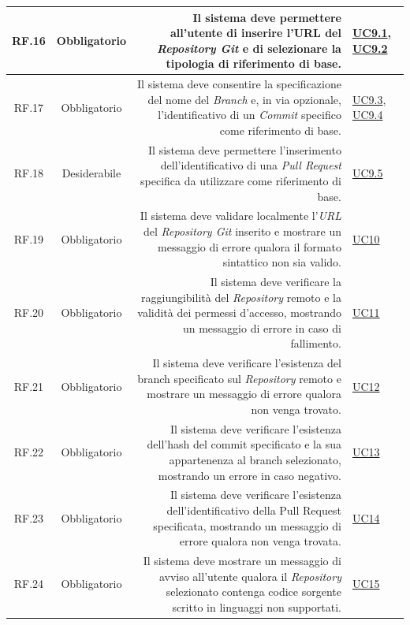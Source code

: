\documentclass[12pt, a4paper]{article}
\begin{document}
\begin{xltabular}{\textwidth}{|c|c|D|F|}
    RF.16 & Obbligatorio & Il sistema deve permettere all'utente di inserire l'URL del \textit{Repository Git} e di selezionare la tipologia di riferimento di base. & \hyperref[uc:9.1]{UC9.1}, \hyperref[uc:9.2]{UC9.2} \\ \hline
    
    RF.17 & Obbligatorio & Il sistema deve consentire la specificazione del nome del \textit{Branch} e, in via opzionale, l'identificativo di un \textit{Commit} specifico come riferimento di base. & \hyperref[uc:9.3]{UC9.3}, \hyperref[uc:9.4]{UC9.4} \\ \hline
    
    RF.18 & Desiderabile & Il sistema deve permettere l'inserimento dell'identificativo di una \textit{Pull Request} specifica da utilizzare come riferimento di base. & \hyperref[uc:9.5]{UC9.5} \\ \hline
    
    RF.19 & Obbligatorio & Il sistema deve validare localmente l'\textit{URL} del \textit{Repository Git} inserito e mostrare un messaggio di errore qualora il formato sintattico non sia valido. & \hyperref[uc:10]{UC10} \\ \hline
    
    RF.20 & Obbligatorio & Il sistema deve verificare la raggiungibilità del \textit{Repository} remoto e la validità dei permessi d'accesso, mostrando un messaggio di errore in caso di fallimento. & \hyperref[uc:11]{UC11} \\ \hline
    
    RF.21 & Obbligatorio & Il sistema deve verificare l'esistenza del branch specificato sul \textit{Repository} remoto e mostrare un messaggio di errore qualora non venga trovato. & \hyperref[uc:12]{UC12} \\ \hline
    
    RF.22 & Obbligatorio & Il sistema deve verificare l'esistenza dell'hash del commit specificato e la sua appartenenza al branch selezionato, mostrando un errore in caso negativo. & \hyperref[uc:13]{UC13} \\ \hline
    
    RF.23 & Obbligatorio & Il sistema deve verificare l'esistenza dell'identificativo della Pull Request specificata, mostrando un messaggio di errore qualora non venga trovata. & \hyperref[uc:14]{UC14} \\ \hline
    
    RF.24 & Obbligatorio & Il sistema deve mostrare un messaggio di avviso all'utente qualora il \textit{Repository} selezionato contenga codice sorgente scritto in linguaggi non supportati. & \hyperref[uc:15]{UC15} \\ \hline
    

\end{xltabular}
\end{document}
